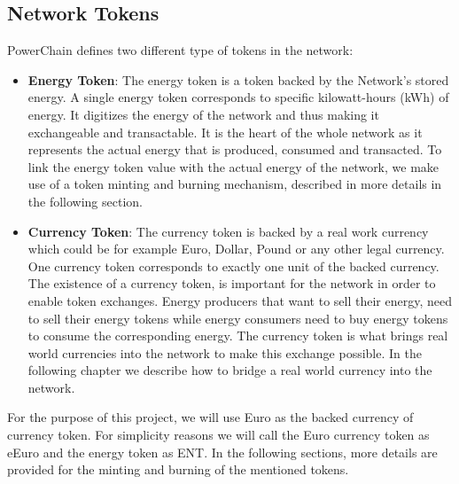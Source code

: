 \subsection{Network Tokens}
PowerChain defines two different type of tokens in the network:
\begin{itemize}
    \item \textbf{Energy Token}: The energy token is a token backed by the Network's stored energy. A single energy token corresponds to specific kilowatt-hours (kWh) of energy. It digitizes the energy of the network and thus making 
    it exchangeable and transactable. It is the heart of the whole network as it represents the actual energy that is produced, consumed and transacted. To link the energy token value with the actual energy of the network, we make use of
    a token minting and burning mechanism, described in more details in the following section.
    \item \textbf{Currency Token}: The currency token is backed by a real work currency which could be for example Euro, Dollar, Pound or any other legal currency. One currency token corresponds to exactly one unit of the backed currency.
    The existence of a currency token, is important for the network in order to enable token exchanges. Energy producers that want to sell their energy, need to sell their energy tokens while energy consumers need to buy energy
    tokens to consume the corresponding energy. The currency token is what brings real world currencies into the network to make this exchange possible. In the following chapter we describe how to bridge a real world currency into the
    network.
\end{itemize}
For the purpose of this project, we will use Euro as the backed currency of currency token. For simplicity reasons we will call the Euro currency token as eEuro and the energy token as ENT.
In the following sections, more details are provided for the minting and burning of the mentioned tokens.\\

